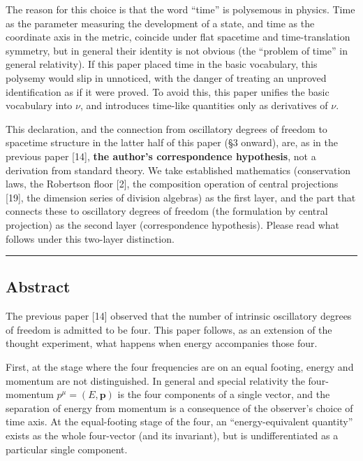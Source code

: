 \documentclass[
]{article}
\begin{document}
The reason for this choice is that the word ``time'' is polysemous in
physics. Time as the parameter measuring the development of a state, and
time as the coordinate axis in the metric, coincide under flat spacetime
and time-translation symmetry, but in general their identity is not
obvious (the ``problem of time'' in general relativity). If this paper
placed time in the basic vocabulary, this polysemy would slip in
unnoticed, with the danger of treating an unproved identification as if
it were proved. To avoid this, this paper unifies the basic vocabulary
into \(\nu\), and introduces time-like quantities only as derivatives of
\(\nu\).

This declaration, and the connection from oscillatory degrees of freedom
to spacetime structure in the latter half of this paper (§3 onward),
are, as in the previous paper {[}14{]}, \textbf{the author's
correspondence hypothesis}, not a derivation from standard theory. We
take established mathematics (conservation laws, the Robertson floor
{[}2{]}, the composition operation of central projections {[}19{]}, the
dimension series of division algebras) as the first layer, and the part
that connects these to oscillatory degrees of freedom (the formulation
by central projection) as the second layer (correspondence hypothesis).
Please read what follows under this two-layer distinction.

\begin{center}\rule{0.5\linewidth}{0.5pt}\end{center}

\subsection{Abstract}\label{abstract}

The previous paper {[}14{]} observed that the number of intrinsic
oscillatory degrees of freedom is admitted to be four. This paper
follows, as an extension of the thought experiment, what happens when
energy accompanies those four.

First, at the stage where the four frequencies are on an equal footing,
energy and momentum are not distinguished. In general and special
relativity the four-momentum \(p^\mu=(E,\boldsymbol{p})\) is the four
components of a single vector, and the separation of energy from
momentum is a consequence of the observer's choice of time axis. At the
equal-footing stage of the four, an ``energy-equivalent quantity''
exists as the whole four-vector (and its invariant), but is
undifferentiated as a particular single component.
\end{document}
